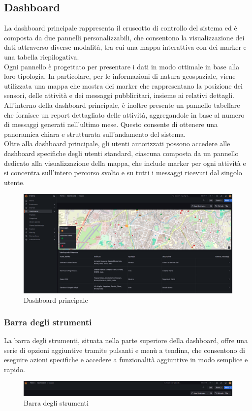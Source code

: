 \documentclass[10pt]{article}
\begin{document}
\begin{justify}
\subsection{Dashboard}
La dashboard principale rappresenta il cruscotto di controllo del sistema ed è composta da due pannelli personalizzabili, che consentono la visualizzazione dei dati attraverso diverse modalità, tra cui una mappa interattiva con dei marker e una tabella riepilogativa.\\
Ogni pannello è progettato per presentare i dati in modo ottimale in base alla loro tipologia. In particolare, per le informazioni di natura geospaziale, viene utilizzata una mappa che mostra dei marker che rappresentano la posizione dei sensori, delle attività e dei messaggi pubblicitari, insieme ai relativi dettagli. All'interno della dashboard principale, è inoltre presente un pannello tabellare che fornisce un report dettagliato delle attività, aggregandole in base al numero di messaggi generati nell'ultimo mese. Questo consente di ottenere una panoramica chiara e strutturata sull'andamento del sistema.\\
Oltre alla dashboard principale, gli utenti autorizzati possono accedere alle dashboard specifiche degli utenti standard, ciascuna composta da un pannello dedicato alla visualizzazione della mappa, che include marker per ogni attività e si concentra sull'intero percorso svolto e su tutti i messaggi ricevuti dal singolo utente.\\
\begin{figure}[H]
    \centering
    \includegraphics[width=1\linewidth]{dashboard.png}
    \caption{Dashboard principale}
\end{figure}

    \subsubsection{Barra degli strumenti} %
    La barra degli strumenti, situata nella parte superiore della dashboard, offre una serie di opzioni aggiuntive tramite pulsanti e menù a tendina, che consentono di eseguire azioni specifiche e accedere a funzionalità aggiuntive in modo semplice e rapido.\\
    \begin{figure}[H]
    \centering
    \includegraphics[width=1\linewidth]{barra.png}
    \caption{Barra degli strumenti}
    \end{figure}


\end{justify}
\end{document}
